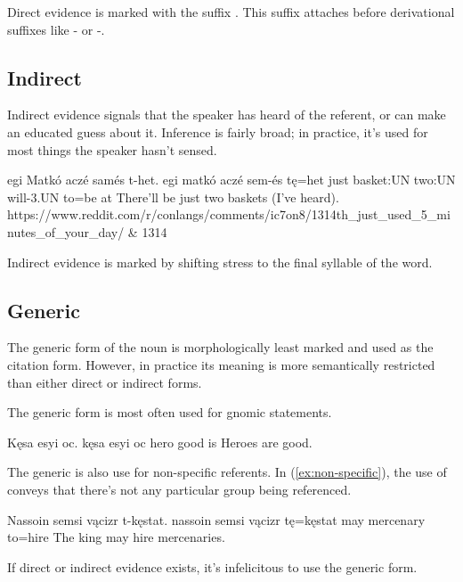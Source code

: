 Direct evidence is marked with the suffix . This suffix attaches before derivational suffixes like - or -.

\subsection{Indirect}
Indirect evidence signals that the speaker has heard of the referent, or can make an educated guess about it. Inference is fairly broad; in practice, it's used for most things the speaker hasn't sensed. 

\begin{examples*}
    \ex \label{ex:indirect_evidence}
        \script egi Matkó aczé samés t-het.
        \bits egi matkó aczé sem-és tę=het
        \gloss just basket:UN two:UN will-3.UN to={be at}
        \tr There'll be just two baskets (I've heard).
        \smoyd https://www.reddit.com/r/conlangs/comments/ic7on8/1314th_just_used_5_minutes_of_your_day/ & 1314
\end{examples*}

Indirect evidence is marked by shifting stress to the final syllable of the word.

\subsection{Generic}
The generic form of the noun is morphologically least marked and used as the citation form. However, in practice its meaning is more semantically restricted than either direct or indirect forms.

The generic form is most often used for gnomic statements.

\begin{example}
    \script Kęsa esyi oc.
    \bits kęsa esyi oc
    \gloss hero good is
    \tr Heroes are good.
\end{example}

The generic is also use for non-specific referents. In (\ref{ex:non-specific}), the use of  conveys that there's not any particular group being referenced.

\begin{example} \label{ex:non-specific}
    \script Nassoin semsi vącizr t-kęstat.
    \bits nassoin semsi vącizr tę=kęstat
     may mercenary to=hire
    \tr The king may hire mercenaries.
\end{example}

If direct or indirect evidence exists, it's infelicitous to use the generic form.

